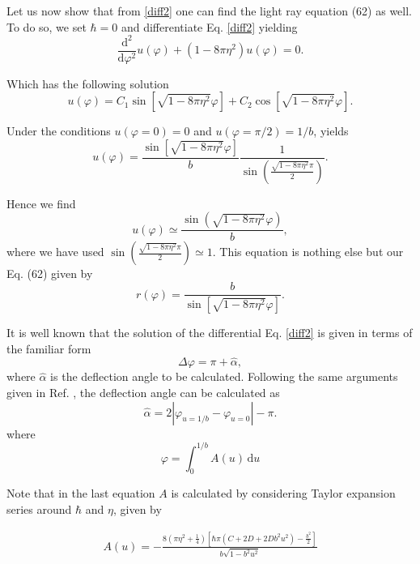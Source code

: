 \documentclass[preprint,superscriptaddress,amsfonts,amssymb,amsmath,showpacs]{revtex4}
\begin{document}
Let us now show that from \eqref{diff2} one can find the light ray equation (62) as well. To do so, we set $\hbar=0$ and differentiate Eq. \eqref{diff2} yielding 
\begin{equation}
\frac{\mathrm{d}^2}{\mathrm{d}\varphi^2}u(\varphi)+(1-8 \pi \eta^2) u(\varphi)=0.
\end{equation}

Which has the following solution
\begin{equation}
u(\varphi)=C_1 \sin\left[\sqrt{1-8 \pi \eta^2}\varphi\right]+C_2 \cos\left[\sqrt{1-8 \pi \eta^2}\varphi\right].
\end{equation}

Under the conditions $u(\varphi=0)=0$ and $u(\varphi=\pi/2)=1/b$, yields
\begin{equation}
u(\varphi)=\frac{\sin\left[\sqrt{1-8 \pi \eta^2} \varphi\right]}{b}\frac{1}{\sin\left(\frac{\sqrt{1-8 \pi \eta^2} \pi}{2}    \right)}.
\end{equation}

Hence we find
\begin{equation}
u(\varphi)\simeq \frac{\sin\left(\sqrt{1-8 \pi \eta^2} \varphi\right)}{b},
\end{equation}
where we have used $\sin\left(\frac{\sqrt{1-8 \pi \eta^2}\pi}{2}\right)\simeq 1 $. This equation is nothing else but our Eq. (62) given by
\begin{equation}
r(\varphi)=\frac{b}{\sin\left[\sqrt{1-8 \pi \eta^2}\varphi\right]}.
\end{equation}

It is well known that the solution of the differential Eq. \eqref{diff2} is given in terms of the familiar form  \cite{Boyer,weinberg}
\begin{equation}
\Delta \varphi =\pi+\hat{\alpha},
\end{equation}
where $\hat{\alpha}$ is the deflection angle to be calculated. Following the same arguments given in Ref. \cite{weinberg}, the deflection angle can be calculated as
\begin{equation}
\hat{\alpha}=2|\varphi_{u=1/b}-\varphi_{u=0}|-\pi.
\end{equation}
where 
\begin{equation}
\varphi=\int_0^{1/b} A(u)\, \mathrm{d}u
\end{equation}

Note that in the last equation $A$ is calculated by considering Taylor expansion series around $\hbar$ and $\eta$, given by

\begin{eqnarray}
A(u)= -\frac{8 \left(\pi \eta^2+\frac{1}{4}   \right) \left[\hbar \pi \left(C+2D+2Db^2 u^2   \right)-\frac{b^2}{2}    \right]}{b \sqrt{1-b^2 u^2}}
\end{eqnarray}
\end{document}
